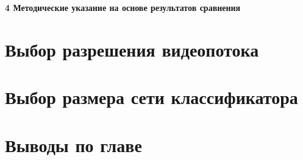\newpage
\begin{center}
  \textbf{\large 4 Методические указание на основе результатов сравнения}
\end{center}

\section{Выбор разрешения видеопотока}

\section{Выбор размера сети классификатора}


\section{Выводы по главе}
